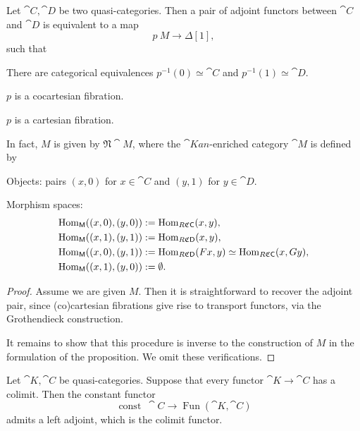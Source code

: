 \begin{proposition}
    Let $\cat C,\cat D$ be two quasi-categories.
    Then a pair of adjoint functors between $\cat C$ and $\cat D$
    is equivalent to a map 
    \[ p\:M\to\Delta[1], \]
    such that 
    \begin{itms}
        \item There are categorical equivalences
        $p^{-1}(0)\simeq\cat C$ and $p^{-1}(1)\simeq\cat D$.
        \item $p$ is a cocartesian fibration.
        \item $p$ is a cartesian fibration.
    \end{itms}
    In fact, $M$ is given by $\mathfrak N\cat M$,
    where the $\cat{Kan}$-enriched category $\cat M$ is defined by 
    \begin{itms}
        \item Objects: pairs $(x,0)$ for $x\in\cat C$ and $(y,1)$ for $y\in\cat D$.
        \item Morphism spaces:
        \[ \begin{aligned}
            \operatorname{Hom}_{\textup{\textsf{M}}}((x,0),(y,0)) &:= \operatorname{Hom}_{R\mathfrak C\textup{\textsf{C}}}(x,y), \\
            \operatorname{Hom}_{\textup{\textsf{M}}}((x,1),(y,1)) &:= \operatorname{Hom}_{R\mathfrak C\textup{\textsf{D}}}(x,y), \\
            \operatorname{Hom}_{\textup{\textsf{M}}}((x,0),(y,1)) &:= \operatorname{Hom}_{R\mathfrak C\textup{\textsf{D}}}(Fx,y)\simeq\operatorname{Hom}_{R\mathfrak C\textup{\textsf{C}}}(x,Gy), \\
            \operatorname{Hom}_{\textup{\textsf{M}}}((x,1),(y,0)) &:= \emptyset.
        \end{aligned} \]
    \end{itms}
\end{proposition}

\begin{proof}
    Assume we are given $M$.
    Then it is straightforward to recover the adjoint pair, since (co)cartesian fibrations 
    give rise to transport functors, via the Grothendieck construction.

    It remains to show that this procedure is inverse to 
    the construction of $M$ in the formulation of the proposition.
    We omit these verifications.
\end{proof}

\begin{proposition}
    Let $\cat K,\cat C$ be quasi-categories.
    Suppose that every functor $\cat K\to\cat C$ has a colimit.
    Then the constant functor 
    \[ \operatorname{const}\:\cat C\to\operatorname{Fun}(\cat K,\cat C) \]
    admits a left adjoint, which is the colimit functor.
\end{proposition}

